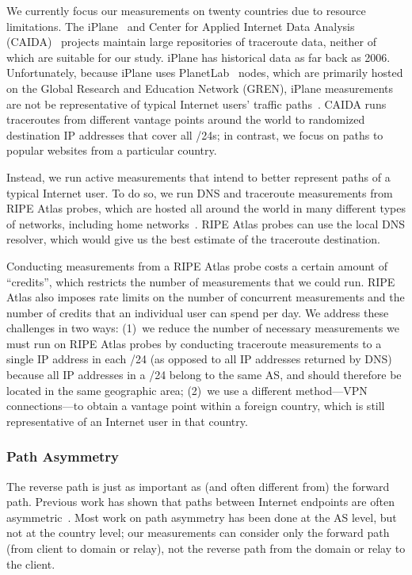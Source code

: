 We currently focus our measurements on twenty countries due to resource limitations.
The iPlane~\cite{madhyastha2006iplane} and Center for Applied Internet Data
Analysis (CAIDA)~\cite{caida} projects maintain large repositories of
traceroute data, neither of which are suitable for our study.   iPlane has
historical data as far back as 2006. Unfortunately, because iPlane uses
PlanetLab~\cite{PlanetLab} nodes, which are primarily hosted on the Global
Research and Education Network (GREN), iPlane measurements are not be
representative of typical Internet users' traffic
paths~\cite{banerjee2004interdomain}.  CAIDA runs traceroutes from different
vantage points around the world to randomized destination IP addresses that
cover all /24s; in contrast, we focus on paths to popular websites from a
particular country.

Instead, we run active measurements that
intend to better represent paths of a typical Internet user. To do so, we run
DNS and traceroute measurements from RIPE Atlas probes, which are hosted
all around the world in many different types of networks, including home
networks~\cite{ripe_atlas}.  RIPE Atlas probes can use the local DNS
resolver, which would give us the best estimate of the traceroute
destination.  

Conducting measurements from a RIPE Atlas probe costs a certain
amount of ``credits'', which restricts the number of measurements that we
could run.  RIPE Atlas also imposes rate limits on the number of
concurrent measurements and the number of credits that an individual
user can spend per day.  We address these challenges in two ways: (1)~we
reduce the number of necessary measurements we must run on RIPE Atlas
probes by conducting traceroute measurements to a single IP address in
each /24 (as opposed to all IP addresses returned by DNS) because all IP
addresses in a /24 belong to the same AS, and should therefore be
located in the same geographic area; (2)~we use a different method---VPN
connections---to obtain a vantage point within a foreign country, which
is still representative of an Internet user in that country.

\subsubsection{Path Asymmetry}
\label{path_sym}

The reverse path is just as important as (and often different from) the
forward path.   Previous work has shown that paths between Internet endpoints
are often asymmetric~\cite{he2005routing}.  Most work on path asymmetry has
been done at the AS level, but not at the country level; our measurements can
consider only the forward path (from client to domain or relay), not the
reverse path from the domain or relay to the client.

